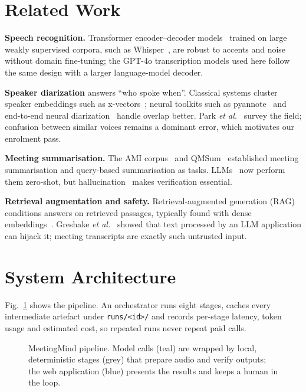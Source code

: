 \documentclass[conference]{IEEEtran}
\begin{document}
\section{Related Work}
\textbf{Speech recognition.} Transformer encoder--decoder models~\cite{vaswani2017} trained on large weakly supervised corpora,
such as Whisper~\cite{radford2023whisper}, are robust to accents and noise without domain fine-tuning; the GPT-4o transcription
models used here follow the same design with a larger language-model decoder.

\textbf{Speaker diarization} answers ``who spoke when''. Classical systems cluster speaker embeddings such as
x-vectors~\cite{snyder2018xvectors}; neural toolkits such as pyannote~\cite{bredin2020pyannote} and end-to-end neural
diarization~\cite{fujita2019eend} handle overlap better. Park \emph{et al.}~\cite{park2022review} survey the field; confusion
between similar voices remains a dominant error, which motivates our enrolment pass.

\textbf{Meeting summarisation.} The AMI corpus~\cite{carletta2005ami} and QMSum~\cite{zhong2021qmsum} established meeting
summarisation and query-based summarisation as tasks. LLMs~\cite{brown2020gpt3} now perform them zero-shot, but
hallucination~\cite{ji2023hallucination} makes verification essential.

\textbf{Retrieval augmentation and safety.} Retrieval-augmented generation (RAG)~\cite{lewis2020rag} conditions answers on
retrieved passages, typically found with dense embeddings~\cite{karpukhin2020dpr}. Greshake \emph{et al.}~\cite{greshake2023}
showed that text processed by an LLM application can hijack it; meeting transcripts are exactly such untrusted input.

\section{System Architecture}
Fig.~\ref{fig:arch} shows the pipeline. An orchestrator runs eight stages, caches every intermediate artefact under
\texttt{runs/<id>/} and records per-stage latency, token usage and estimated cost, so repeated runs never repeat paid calls.

\begin{figure}[t]
  \centering
  \resizebox{\textwidth}{!}{}
  \caption{MeetingMind pipeline. Model calls (teal) are wrapped by local, deterministic stages (grey) that prepare audio and
  verify outputs; the web application (blue) presents the results and keeps a human in the loop.}
  \label{fig:arch}
\end{figure}
\end{document}
